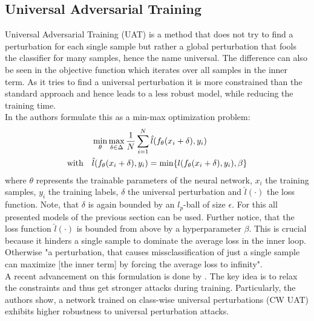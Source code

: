 \documentclass{article}
\begin{document}
\subsection{Universal Adversarial Training}
Universal Adversarial Training (UAT) is a method that does not try to find a perturbation for each single sample but rather a global perturbation that fools the classifier for many samples, hence the name universal. The difference can also be seen in the objective function which iterates over all samples in the inner term. As it tries to find a universal perturbation it is more constrained than the standard approach and hence leads to a less robust model, while reducing the training time. \\
In \cite{b4} the authors formulate this as a min-max optimization problem:
\begingroup
\setlength\abovedisplayskip{0pt}
\setlength\belowdisplayskip{6pt}
\begin{align}
  \label{eqn:universal}
  & \min_{\theta} \max_{\delta \in \Delta} \space \frac{1}{N} \sum_{i=1}^N \space \hat{l}(f_{\theta}(x_i + \delta), y_i) \\
  \text{with} \quad & \hat{l}(f_{\theta}(x_i + \delta), y_i) = \min \{l(f_{\theta}(x_i + \delta), y_i), \beta \}
\end{align}
\endgroup
where $\theta$ represents the trainable parameters of the neural network, $x_i$ the training samples, $y_i$ the training labels, $\delta$ the universal perturbation and $\hat{l}(\cdot)$ the loss function. Note, that $\delta$ is again bounded by an $l_p$-ball of size $\epsilon$. For this all presented models of the previous section can be used. Further notice, that the loss function $\hat{l}(\cdot)$ is bounded from above by a hyperparameter $\beta$. This is crucial because it hinders a single sample to dominate the average loss in the inner loop. Otherwise "a perturbation, that causes missclassification of just a single sample can maximize [the inner term] by forcing the average loss to infinity"\cite{b4}. \\
A recent advancement on this formulation is done by \cite{b11}. The key idea is to relax the constraints and thus get stronger attacks during training. Particularly, the authors show, a network trained on class-wise universal perturbations (CW UAT) exhibits higher robustness to universal perturbation attacks.
  
\end{document}
